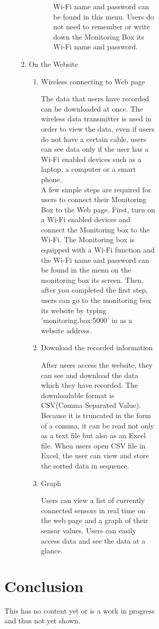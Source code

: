 \documentclass[conference]{IEEEtran}
\begin{document}
\begin{figure*}[ht]
\begin{enumerate}
\begin{enumerate}
\begin{figure*}[!ht]
\begin{enumerate}
\begin{enumerate}
\begin{enumerate}
\begin{enumerate}
						Wi-Fi name and password can be found in this menu. Users do not need to remember or write down the Monitoring Box its Wi-Fi name and password.\\
				\end{enumerate}
			\end{enumerate}
		\item On the Website
			\begin{enumerate}
				\item Wireless connecting to Web page

					The data that users have recorded can be downloaded at once. The wireless data transmitter is used in order to view the data, even if users do not have a certain cable, users can see data only if the user has a Wi-Fi enabled devices such as a laptop, a computer or a smart phone. \\
					A few simple steps are required for users to connect their Monitoring Box to the Web page. First, turn on a Wi-Fi enabled devices and connect the Monitoring box to the Wi-Fi. The Monitoring box is equipped with a Wi-Fi function and the Wi-Fi name and password can be found in the menu on the monitoring box its screen. Then, after you completed the first step, users can go to the monitoring box its website by typing 'monitoring.box:5000' in as a website address.\\

				\item Download the recorded information

					After users access the website, they can see and download the data which they have recorded. The downloadable format is CSV(Comma Separated Value). Because it is truncated in the form of a comma, it can be read not only as a text file but also as an Excel file. When users open CSV file in Excel, the user can view and store the sorted data in sequence.\\

				\item Graph

					Users can view a list of currently connected sensors in real time on the web page and a graph of their sensor values. Users can easily access data and see the data at a glance.\\
			\end{enumerate}
		\end{enumerate}
 	\end{enumerate}
\section{Conclusion}
	This has no content yet or is a work in progress and thus not yet shown.


\end{figure*}
\end{enumerate}
\end{enumerate}
\end{figure*}
\end{document}
